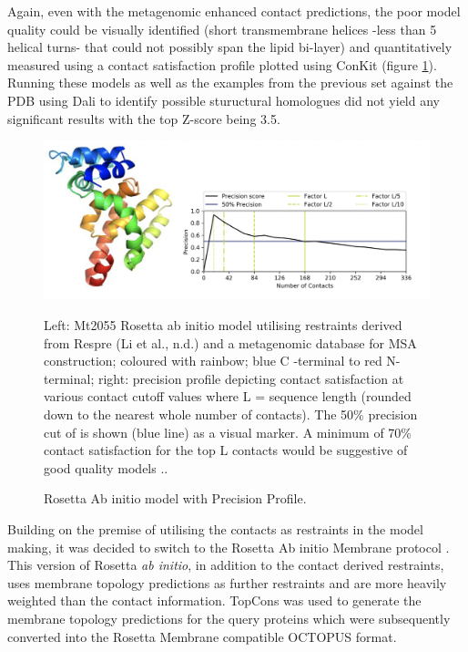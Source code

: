 Again, even with the metagenomic enhanced contact predictions, the poor model quality could be visually identified (short transmembrane helices -less than 5 helical turns- that could not possibly span the lipid bi-layer) and quantitatively measured using a contact satisfaction profile plotted using ConKit (figure \ref{fig:precision}).  Running these models as well as the examples from the previous set against the PDB using Dali \cite{Holm2016} to identify possible stuructural homologues did not yield any significant results with the top Z-score being 3.5.

\begin{figure}[th!]
    \includegraphics[width=\textwidth]{Results/meta_ros_model_fig.png}
    \caption{Rosetta Ab initio model with Precision Profile.}
    \label{fig:precision}
    \small
    Left: Mt2055 Rosetta ab initio model utilising restraints derived from Respre (Li et al.,
n.d.) and a metagenomic database for MSA construction; coloured with rainbow; blue C -terminal
to red N-terminal; right: precision profile depicting contact satisfaction at various contact cutoff values where L = sequence length (rounded down to the nearest whole number of contacts). The 50\% precision cut of is shown (blue line) as a visual marker. A minimum of 70\% contact satisfaction for the top L contacts would be suggestive of good quality models \cite{de2017comparing}..
\end{figure}

Building on the premise of utilising the contacts as restraints in the model making, it was decided to switch to the Rosetta Ab initio Membrane protocol \cite{alford2015integrated}.  This version of Rosetta \textit{ab initio}, in addition to the contact derived restraints, uses membrane topology predictions as further restraints and are more heavily weighted than the contact information.  TopCons \cite{Tsirigos2015} was used to generate the membrane topology predictions for the query proteins which were subsequently converted into the Rosetta Membrane compatible OCTOPUS \cite{Viklund2008} format.\\

